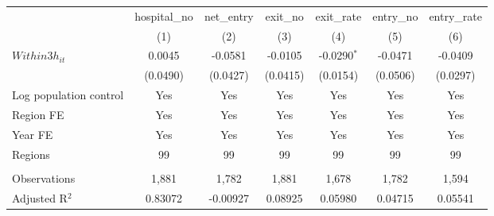 \begingroup
\centering
\begin{tabular}{lcccccc}
   \toprule
                          & hospital\_no  & net\_entry  & exit\_no  & exit\_rate    & entry\_no  & entry\_rate \\    
                          & (1)           & (2)         & (3)       & (4)           & (5)        & (6)\\  
   \midrule 
   $Within3h_{it}$        & 0.0045        & -0.0581     & -0.0105   & -0.0290$^{*}$ & -0.0471    & -0.0409\\   
                          & (0.0490)      & (0.0427)    & (0.0415)  & (0.0154)      & (0.0506)   & (0.0297)\\   
   Log population control & Yes           & Yes         & Yes       & Yes           & Yes        & Yes\\  
   Region FE              & Yes           & Yes         & Yes       & Yes           & Yes        & Yes\\  
   Year FE                & Yes           & Yes         & Yes       & Yes           & Yes        & Yes\\  
   Regions                & 99            & 99          & 99        & 99            & 99         & 99\\  
    \\
   Observations           & 1,881         & 1,782       & 1,881     & 1,678         & 1,782      & 1,594\\  
   Adjusted R$^2$         & 0.83072       & -0.00927    & 0.08925   & 0.05980       & 0.04715    & 0.05541\\  
   \bottomrule
\end{tabular}
\par\endgroup
